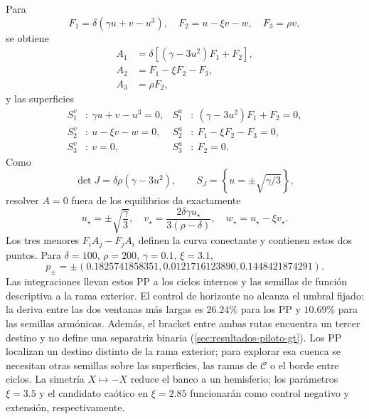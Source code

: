 Para
\begin{equation}
 F_1=\delta(\gamma u+v-u^3),\quad
 F_2=u-\xi v-w,\quad F_3=\rho v,
 \label{casegt:eq:mavpd-field}
\end{equation}
se obtiene
\begin{align}
 A_1&=\delta[(\gamma-3u^2)F_1+F_2],\nonumber\\
 A_2&=F_1-\xi F_2-F_3,\\
 A_3&=\rho F_2,
 \label{casegt:eq:mavpd-A}
\end{align}
y las superficies
\begin{align}
 S_1^v&:\ \gamma u+v-u^3=0,&
 S_1^a&:\ (\gamma-3u^2)F_1+F_2=0,\nonumber\\
 S_2^v&:\ u-\xi v-w=0,&
 S_2^a&:\ F_1-\xi F_2-F_3=0,\nonumber\\
 S_3^v&:\ v=0,& S_3^a&:\ F_2=0.
 \label{casegt:eq:mavpd-surfaces}
\end{align}
Como
\begin{equation}
 \det J=\delta\rho(\gamma-3u^2),
 \qquad
 S_J=\left\{u=\pm\sqrt{\gamma/3}\right\},
 \label{casegt:eq:mavpd-det}
\end{equation}
resolver $A=0$ fuera de los equilibrios da exactamente
\begin{equation}
 u_\star=\pm\sqrt{\frac\gamma3},
 \quad
 v_\star=\frac{2\delta\gamma u_\star}{3(\rho-\delta)},
 \quad
 w_\star=u_\star-\xi v_\star.
 \label{casegt:eq:mavpd-PP}
\end{equation}
Los tres menores $F_iA_j-F_jA_i$ definen la curva conectante y contienen estos
dos puntos. Para $\delta=100$, $\rho=200$, $\gamma=0.1$, $\xi=3.1$,
\begin{equation}
 p_\pm=\pm(0.1825741858351,0.0121716123890,0.1448421874291).
 \label{casegt:eq:mavpd-PP-numeric}
\end{equation}
Las integraciones llevan estos PP a los ciclos internos y las semillas de
función descriptiva a la rama exterior. El control de horizonte no alcanza
el umbral fijado: la deriva entre las dos ventanas más largas es
$26.24\%$ para los PP y $10.69\%$ para las semillas armónicas.
\ifHAFOBasinMaterial
Además, el bracket entre
ambas rutas encuentra un tercer destino y no define una separatriz binaria
(\cref{sec:resultados-piloto-gt}). Los PP localizan un destino distinto de la
rama exterior; para explorar esa cuenca se necesitan otras semillas sobre
las superficies, las ramas de $\mathcal C$ o el borde entre ciclos.
\fi
La simetría $X\mapsto-X$ reduce el banco a un hemisferio;
los parámetros $\xi=3.5$ y el candidato caótico en $\xi=2.85$ funcionarán como
control negativo y extensión, respectivamente.

